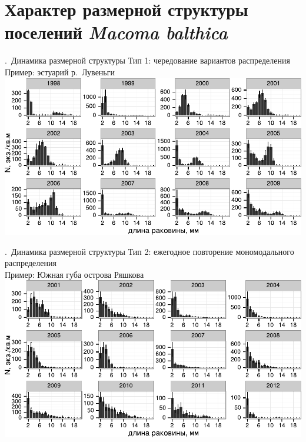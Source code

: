 \documentclass[aspectratio=169, xcolor=table]{beamer}
\begin{document}
		\section[Размерная структура]{Характер размерной структуры поселений {\it Macoma balthica}}

\begin{frame}{\insertpagenumber.\ Динамика размерной структуры}
Тип 1: чередование вариантов распределения\\
Пример: эстуарий р.~Лувеньги\\

			\includegraphics[height=.78\textheight]{Estuary_total_size_oneplot_nonscale1.pdf}\\
\end{frame}



\begin{frame}{\insertpagenumber.\ Динамика размерной структуры}
Тип 2: ежегодное повторение мономодального распределения\\
Пример: Южная губа острова Ряшкова\\

			\includegraphics[height=.78\textheight]{YuG_sizestr_oneplot_nonscale1.pdf}
\end{frame}
\end{document}
